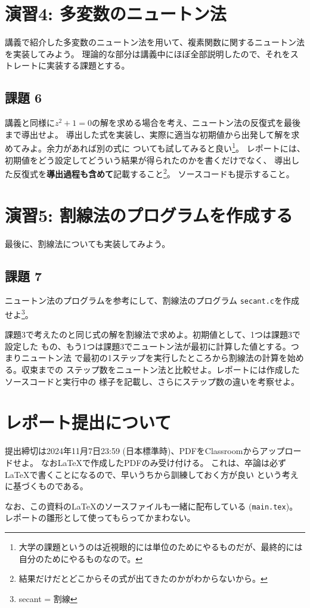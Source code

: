 \documentclass[a4paper]{jsarticle}
\begin{document}
\section*{演習4: 多変数のニュートン法}

講義で紹介した多変数のニュートン法を用いて、複素関数に関するニュートン法を実装してみよう。
理論的な部分は講義中にほぼ全部説明したので、それをストレートに実装する課題とする。

\subsection*{課題 6}

講義と同様に$z^{2}+1 = 0$の解を求める場合を考え、ニュートン法の反復式を最後まで導出せよ。
導出した式を実装し、実際に適当な初期値から出発して解を求めてみよ。余力があれば別の式に
ついても試してみると良い\footnote{大学の課題というのは近視眼的には単位のためにやるものだが、最終的には自分のためにやるものなので。}。
レポートには、初期値をどう設定してどういう結果が得られたのかを書くだけでなく、
導出した反復式を\textbf{導出過程も含めて}記載すること\footnote{結果だけだとどこからその式が出てきたのかがわからないから。}。
ソースコードも提示すること。

\section*{演習5: 割線法のプログラムを作成する}

最後に、割線法についても実装してみよう。

\subsection*{課題 7}

ニュートン法のプログラムを参考にして、割線法のプログラム
\texttt{secant.c}を作成せよ\footnote{secant = 割線}。

課題3で考えたのと同じ式の解を割線法で求めよ。初期値として、1つは課題3で設定した
もの、もう1つは課題3でニュートン法が最初に計算した値とする。つまりニュートン法
で最初の1ステップを実行したところから割線法の計算を始める。収束までの
ステップ数をニュートン法と比較せよ。レポートには作成したソースコードと実行中の
様子を記載し、さらにステップ数の違いを考察せよ。

\section*{レポート提出について}

提出締切は2024年11月7日23:59 (日本標準時)、PDFをClassroomからアップロードせよ。
なお\LaTeX で作成したPDFのみ受け付ける。
これは、卒論は必ず\LaTeX で書くことになるので、早いうちから訓練しておく方が良い
という考えに基づくものである。

なお、この資料の\LaTeX のソースファイルも一緒に配布している (\texttt{main.tex})。
レポートの雛形として使ってもらってかまわない。
\end{document}
